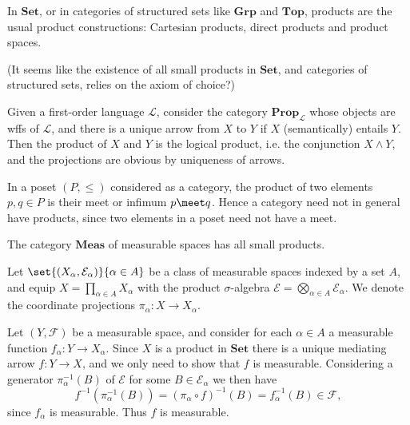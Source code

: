 \documentclass[article, a4paper, 11pt, oneside]{memoir}
\numberwithin{equation}{chapter}
\newcommand{\calL}{\mathcal{L}}
\newcommand{\calE}{\mathcal{E}}
\newcommand{\calF}{\mathcal{F}}
\newcommand{\ncat}[1]{\mathbf{#1}} %
\newcommand{\catSet}{\ncat{Set}}
\newcommand{\catTop}{\ncat{Top}}
\newcommand{\catGrp}{\ncat{Grp}}
\newcommand{\catProp}{\ncat{Prop}}
\newcommand{\catMeas}{\ncat{Meas}}
\theoremstyle{myexample}
\theoremstyle{myexamplebreak}
\begin{document}
\begin{examplebreak}
    \begin{enumexample}
        \item In $\catSet$, or in categories of structured sets like $\catGrp$ and $\catTop$, products are the usual product constructions: Cartesian products, direct products and product spaces.

        (It seems like the existence of all small products in $\catSet$, and categories of structured sets, relies on the axiom of choice?)
        
        \item Given a first-order language $\calL$, consider the category $\catProp_\calL$ whose objects are wffs of $\calL$, and there is a unique arrow from $X$ to $Y$ if $X$ (semantically) entails $Y$. Then the product of $X$ and $Y$ is the logical product, i.e. the conjunction $X \land Y$, and the projections are obvious by uniqueness of arrows.
        
        \item In a poset $(P, \leq)$ considered as a category, the product of two elements $p, q \in P$ is their meet or infimum $p \meet q$. Hence a category need not in general have products, since two elements in a poset need not have a meet.
        
        \item The category $\catMeas$ of measurable spaces has all small products.
        
        Let $\set{(X_\alpha, \calE_\alpha)}{\alpha \in A}$ be a class of measurable spaces indexed by a set $A$, and equip $X = \prod_{\alpha \in A} X_\alpha$ with the product $\sigma$-algebra $\calE = \bigotimes_{\alpha \in A} \calE_\alpha$. We denote the coordinate projections $\pi_\alpha \colon X \to X_\alpha$.
    
        Let $(Y, \calF)$ be a measurable space, and consider for each $\alpha \in A$ a measurable function $f_\alpha \colon Y \to X_\alpha$. Since $X$ is a product in $\catSet$ there is a unique mediating arrow $f \colon Y \to X$, and we only need to show that $f$ is measurable. Considering a generator $\pi_\alpha^{-1}(B)$ of $\calE$ for some $B \in \calE_\alpha$ we then have
        \begin{equation*}
            f^{-1}(\pi_\alpha^{-1}(B))
                = (\pi_\alpha \circ f)^{-1}(B)
                = f_\alpha^{-1}(B) \in \calF,
        \end{equation*}
        since $f_\alpha$ is measurable. Thus $f$ is measurable.
    \end{enumexample}
\end{examplebreak}
\end{document}
